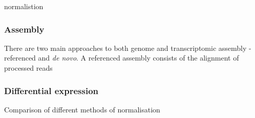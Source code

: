 normalistion




\subsubsection{Assembly}

There are two main approaches to both genome and transcriptomic assembly - referenced and \textit{de novo}.
A referenced assembly consists of the alignment of processed reads 

\subsubsection{Differential expression}

Comparison of different methods of normalisation \citep{Dillies2013}




%
%
%
%
%
%

